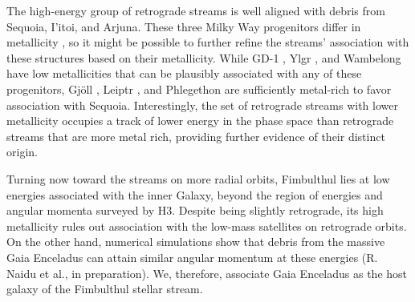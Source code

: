 \documentclass[twocolumn]{aastex63}
\newcommand{\feh}{\ensuremath{\textrm{[Fe/H]}}}
\begin{document}
The high-energy group of retrograde streams is well aligned with debris from Sequoia, I'itoi, and Arjuna.
These three Milky Way progenitors differ in metallicity \citep{naidu2020}, so it might be possible to further refine the streams' association with these structures based on their metallicity.
While GD-1 \citep[spectroscopic $\feh=-2.3$,][]{bonaca2020b}, Ylgr \citep[spectroscopic $\feh=-1.9$,][]{ibata2019}, and  Wambelong \citep[isochrone $\feh=-2.2$,][]{shipp2018} have low metallicities that can be plausibly associated with any of these progenitors, Gj\" oll \citep[spectroscopic $\feh=-1.5$,][]{hansen2020}, Leiptr \citep[isochrone $\feh=-1.6$,][]{ibata2019}, and Phlegethon \citep[spectroscopic $\feh=-1.6$,][]{ibata2018} are sufficiently metal-rich to favor association with Sequoia.
Interestingly, the set of retrograde streams with lower metallicity occupies a track of lower energy in the phase space than retrograde streams that are more metal rich, providing further evidence of their distinct origin.

Turning now toward the streams on more radial orbits, Fimbulthul lies at low energies associated with the inner Galaxy, beyond the region of energies and angular momenta surveyed by H3.
Despite being slightly retrograde, its high metallicity rules out association with the low-mass satellites on retrograde orbits.
On the other hand, numerical simulations show that debris from the massive Gaia Enceladus can attain similar angular momentum at these energies (R. Naidu et al., in preparation).
We, therefore, associate Gaia Enceladus as the host galaxy of the Fimbulthul stellar stream.

\end{document}
